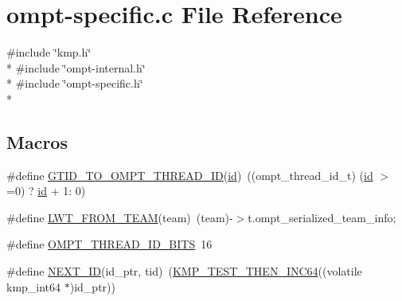 \hypertarget{ompt-specific_8c}{\section{ompt-\/specific.c File Reference}
\label{ompt-specific_8c}
}
{\ttfamily \#include \char`\"{}kmp.\-h\char`\"{}}\\*
{\ttfamily \#include \char`\"{}ompt-\/internal.\-h\char`\"{}}\\*
{\ttfamily \#include \char`\"{}ompt-\/specific.\-h\char`\"{}}\\*
\subsection*{Macros}
\begin{DoxyCompactItemize}
\item 
\#define \hyperlink{ompt-specific_8c_a8d6947d5f3a5a21112fcb8bb678fc5bc}{G\-T\-I\-D\-\_\-\-T\-O\-\_\-\-O\-M\-P\-T\-\_\-\-T\-H\-R\-E\-A\-D\-\_\-\-I\-D}(\hyperlink{ittnotify__static_8h_a9ebeaf6e841ab2e3ed2f92a8850e0c3d}{id})~((ompt\-\_\-thread\-\_\-id\-\_\-t) (\hyperlink{ittnotify__static_8h_a9ebeaf6e841ab2e3ed2f92a8850e0c3d}{id} $>$=0) ? \hyperlink{ittnotify__static_8h_a9ebeaf6e841ab2e3ed2f92a8850e0c3d}{id} + 1\-: 0)
\item 
\#define \hyperlink{ompt-specific_8c_a9dc12459c8279002a0191618e32c5366}{L\-W\-T\-\_\-\-F\-R\-O\-M\-\_\-\-T\-E\-A\-M}(team)~(team)-\/$>$t.\-ompt\-\_\-serialized\-\_\-team\-\_\-info;
\item 
\#define \hyperlink{ompt-specific_8c_a685ad6ac6170937d5a5d596af276b42a}{O\-M\-P\-T\-\_\-\-T\-H\-R\-E\-A\-D\-\_\-\-I\-D\-\_\-\-B\-I\-T\-S}~16
\item 
\#define \hyperlink{ompt-specific_8c_acb567df2f081ca57ef1be6e2adb72512}{N\-E\-X\-T\-\_\-\-I\-D}(id\-\_\-ptr, tid)~(\hyperlink{kmp__os_8h_aee7d2212f088bf506be1b14d6d41de36}{K\-M\-P\-\_\-\-T\-E\-S\-T\-\_\-\-T\-H\-E\-N\-\_\-\-I\-N\-C64}((volatile kmp\-\_\-int64 $\ast$)id\-\_\-ptr))
\end{DoxyCompactItemize}
